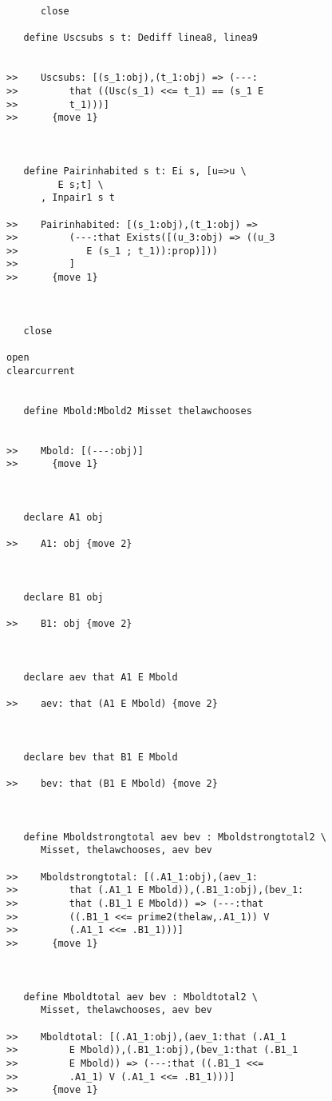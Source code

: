 \documentclass[12pt]{article}
\begin{document}
\begin{verbatim}
      close

   define Uscsubs s t: Dediff linea8, linea9


>>    Uscsubs: [(s_1:obj),(t_1:obj) => (---:
>>         that ((Usc(s_1) <<= t_1) == (s_1 E
>>         t_1)))]
>>      {move 1}



   define Pairinhabited s t: Ei s, [u=>u \
         E s;t] \
      , Inpair1 s t

>>    Pairinhabited: [(s_1:obj),(t_1:obj) =>
>>         (---:that Exists([(u_3:obj) => ((u_3
>>            E (s_1 ; t_1)):prop)]))
>>         ]
>>      {move 1}



   close

open
clearcurrent


   define Mbold:Mbold2 Misset thelawchooses


>>    Mbold: [(---:obj)]
>>      {move 1}



   declare A1 obj

>>    A1: obj {move 2}



   declare B1 obj

>>    B1: obj {move 2}



   declare aev that A1 E Mbold

>>    aev: that (A1 E Mbold) {move 2}



   declare bev that B1 E Mbold

>>    bev: that (B1 E Mbold) {move 2}



   define Mboldstrongtotal aev bev : Mboldstrongtotal2 \
      Misset, thelawchooses, aev bev

>>    Mboldstrongtotal: [(.A1_1:obj),(aev_1:
>>         that (.A1_1 E Mbold)),(.B1_1:obj),(bev_1:
>>         that (.B1_1 E Mbold)) => (---:that
>>         ((.B1_1 <<= prime2(thelaw,.A1_1)) V
>>         (.A1_1 <<= .B1_1)))]
>>      {move 1}



   define Mboldtotal aev bev : Mboldtotal2 \
      Misset, thelawchooses, aev bev

>>    Mboldtotal: [(.A1_1:obj),(aev_1:that (.A1_1
>>         E Mbold)),(.B1_1:obj),(bev_1:that (.B1_1
>>         E Mbold)) => (---:that ((.B1_1 <<=
>>         .A1_1) V (.A1_1 <<= .B1_1)))]
>>      {move 1}




\end{verbatim}
\end{document}
